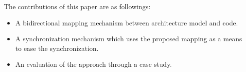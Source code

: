%

%

%






%



	

The contributions of this paper are as followings:
\begin{itemize}
	\item A bidirectional mapping mechanism between architecture model and code.
	
	\item A synchronization mechanism which uses the proposed mapping as a means to ease the synchronization.
	
	\item An evaluation of the approach through a case study.
\end{itemize}

